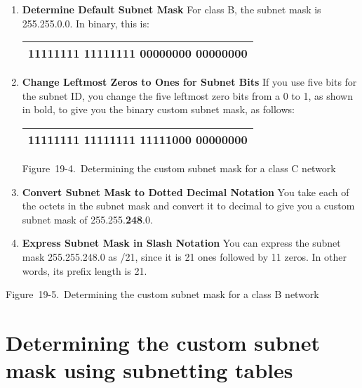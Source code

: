 \begin{enumerate}
\item
  {\textbf{Determine Default Subnet Mask}} For class B, the subnet mask
  is 255.255.0.0. In binary, this is:

  \begin{longtable}[]{@{}l@{}}
  \toprule
  \endhead
  11111111 11111111 00000000 00000000\tabularnewline
  \bottomrule
  \end{longtable}
\item
  {\textbf{Change Leftmost Zeros to Ones for Subnet Bits}} If you use
  five bits for the subnet ID, you change the five leftmost zero bits
  from a 0 to 1, as shown in bold, to give you the binary custom subnet
  mask, as follows:

  \begin{longtable}[]{@{}l@{}}
  \toprule
  \endhead
  11111111 11111111 {\textbf{11111}}000 00000000\tabularnewline
  \bottomrule
  \end{longtable}

  \protect\hypertarget{ch19s03.htmlux5cux23determining_the_custom_subnet_mask_for_a}{}{}

  \protect\hypertarget{ch19s03.htmlux5cux23I_mediaobject5_d1e20800}{}{}

  Figure~19-4.~Determining the custom subnet mask for a class C network
\item
  {\textbf{Convert Subnet Mask to Dotted Decimal Notation}} You take
  each of the octets in the subnet mask and convert it to decimal to
  give you a custom subnet mask of 255.255.{\textbf{248}}.0.
\item
  {\textbf{Express Subnet Mask in Slash Notation}} You can express the
  subnet mask 255.255.248.0 as /21, since it is 21 ones followed by 11
  zeros. In other words, its prefix length is 21.
\end{enumerate}

\protect\hypertarget{ch19s03.htmlux5cux23determining_the_custom_subnet_mask-id001}{}{}

\protect\hypertarget{ch19s03.htmlux5cux23I_mediaobject5_d1e20821}{}{}

Figure~19-5.~Determining the custom subnet mask for a class B network




\section{Determining the custom subnet mask using subnetting tables}

